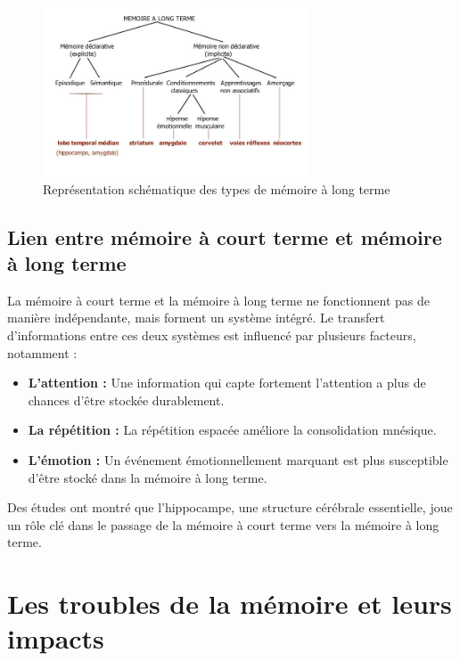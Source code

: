 \documentclass[12pt,a4paper]{report}
\begin{document}
\begin{figure}[h]
    \centering
    \includegraphics[width=0.7\textwidth]{images/types_memoire_long_terme.jpg}
    \caption{Représentation schématique des types de mémoire à long terme}
    \label{fig:mlt}
\end{figure}

\newpage
\subsection{Lien entre mémoire à court terme et mémoire à long terme}

La mémoire à court terme et la mémoire à long terme ne fonctionnent pas de manière indépendante, mais forment un système intégré. Le transfert d'informations entre ces deux systèmes est influencé par plusieurs facteurs, notamment :

\begin{itemize}
    \item \textbf{L'attention :} Une information qui capte fortement l'attention a plus de chances d'être stockée durablement.
    \item \textbf{La répétition :} La répétition espacée améliore la consolidation mnésique.
    \item \textbf{L'émotion :} Un événement émotionnellement marquant est plus susceptible d'être stocké dans la mémoire à long terme.
\end{itemize}

Des études ont montré que l'hippocampe, une structure cérébrale essentielle, joue un rôle clé dans le passage de la mémoire à court terme vers la mémoire à long terme.
\cite{humanite}


\section{Les troubles de la mémoire et leurs impacts}
\end{document}
